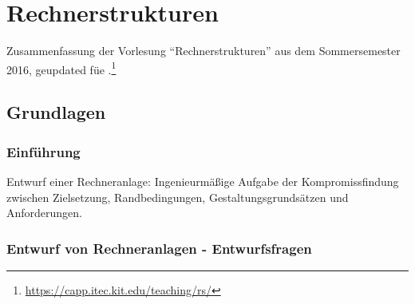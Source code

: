 \chapter{Rechnerstrukturen}

Zusammenfassung der Vorlesung "`Rechnerstrukturen"' aus dem Sommersemester 2016, geupdated füe .\footnote{\url{https://capp.itec.kit.edu/teaching/rs/}}

\section{Grundlagen}

\subsection{Einführung}
Entwurf einer Rechneranlage: Ingenieurmäßige Aufgabe der Kompromissfindung zwischen Zielsetzung, Randbedingungen, Gestaltungsgrundsätzen und Anforderungen.


\subsection{Entwurf von Rechneranlagen - Entwurfsfragen}


